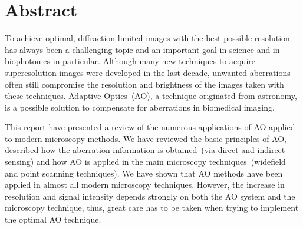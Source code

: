 \section*{Abstract}

To achieve optimal, diffraction limited images with the best possible resolution has always been a challenging topic and an important goal in science and in biophotonics in particular. Although many new techniques to acquire superesolution images were developed in the last decade, unwanted aberrations often still compromise the resolution and brightness of the images taken with these techniques. Adaptive Optics~(AO), a technique originated from astronomy, is a possible solution to compensate for aberrations in biomedical imaging. 

This report have presented a review of the numerous applications of AO applied to modern microscopy methods. We have reviewed the basic principles of AO, described how the aberration information is obtained~(via direct and indirect sensing) and how AO is applied in the main microscopy techniques~(widefield and point scanning techniques). We have shown that AO methods have been applied in almost all modern microscopy techniques. However, the increase in resolution and signal intensity depends strongly on both the AO system and the microscopy technique, thus, great care has to be taken when trying to implement the optimal AO technique.